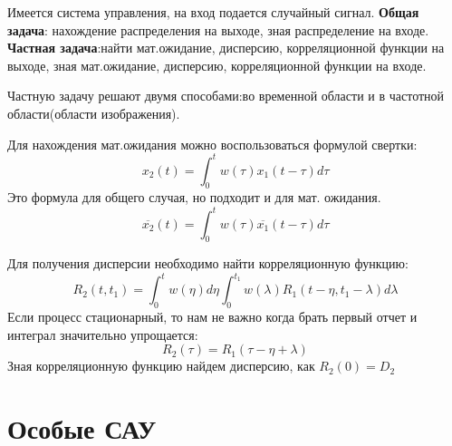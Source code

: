 Имеется система управления, на вход подается случайный сигнал. \textbf{Общая задача}: нахождение распределения на выходе, зная распределение на входе. \textbf{Частная задача}:найти мат.ожидание, дисперсию, корреляционной функции на выходе, зная мат.ожидание, дисперсию, корреляционной функции на входе. 

Частную задачу решают двумя способами:во временной области и в частотной области(области изображения).

Для нахождения мат.ожидания можно воспользоваться формулой свертки:
$$
	x_2(t)=\int^t_0w(\tau)x_1(t-\tau)d\tau
$$
Это формула для общего случая, но подходит и для мат. ожидания.
$$
	\overline{x_2}(t)=\int^t_0w(\tau)\overline{x_1}(t-\tau)d\tau
$$

Для получения дисперсии необходимо найти корреляционную функцию:
$$
	R_2(t,t_1)=\int^t_0w(\eta)d\eta\int^{t_1}_0w(\lambda)R_1(t-\eta,t_1-\lambda)d\lambda
$$
Если процесс стационарный, то нам не важно когда брать первый отчет и интеграл значительно упрощается:
$$
	R_2(\tau)=R_1(\tau-\eta+\lambda)
$$
Зная корреляционную функцию найдем дисперсию, как $R_2(0)=D_2$

\section{Особые САУ}